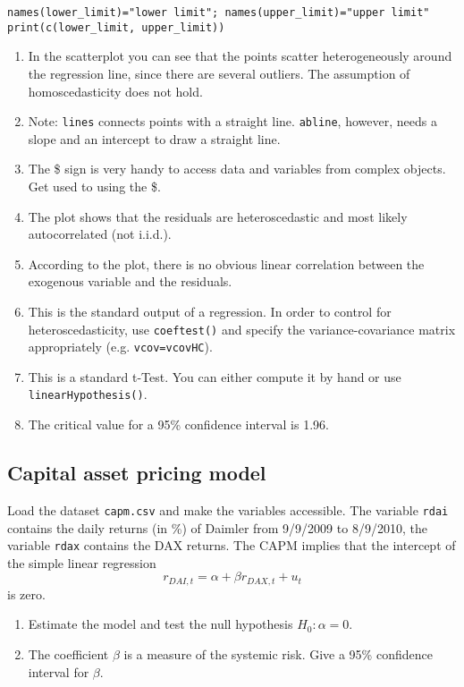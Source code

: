 \documentclass{article}
\begin{document}
\begin{solution}
\begin{verbatim}
names(lower_limit)="lower limit"; names(upper_limit)="upper limit"
print(c(lower_limit, upper_limit))
\end{verbatim}
\begin{enumerate}
  \item In the scatterplot you can see that the points scatter
      heterogeneously around the regression line, since there are several
      outliers. The assumption of homoscedasticity does not hold.
  \item Note: \texttt{lines} connects points with a straight line.
      \texttt{abline}, however, needs a slope and an intercept to draw a
      straight line.
  \item The \$ sign is very handy to access data and variables from
      complex objects. Get used to using the \$.
  \item The plot shows that the residuals are heteroscedastic and
      most likely autocorrelated (not i.i.d.).
  \item According to the plot, there is no obvious linear correlation
      between the exogenous variable and the residuals.
  \item This is the standard output of a regression. In order to control
      for heteroscedasticity, use \texttt{coeftest()} and specify the
      variance-covariance matrix appropriately (e.g.
      \texttt{vcov=vcovHC}).
  \item This is a standard t-Test. You can either compute it by hand or
      use \texttt{linearHypothesis()}.
  \item The critical value for a 95\% confidence interval is 1.96.
\end{enumerate}
\end{solution}



\subsection{Capital asset pricing model}

Load the dataset \texttt{capm.csv} and make the variables accessible. The variable \texttt{rdai} contains the daily returns (in
\%) of Daimler from 9/9/2009 to 8/9/2010, the variable \texttt{rdax}
contains the DAX returns. The CAPM implies that the intercept of the simple
linear regression%
\begin{equation*}
r_{DAI,t}=\alpha +\beta r_{DAX,t}+u_{t}
\end{equation*}%
is zero.

\begin{enumerate}
\item Estimate the model and test the null hypothesis $H_{0}:\alpha =0$.

\item The coefficient $\beta $ is a measure of the systemic risk. Give a
95\% confidence interval for $\beta $.
\end{enumerate}
\end{document}

